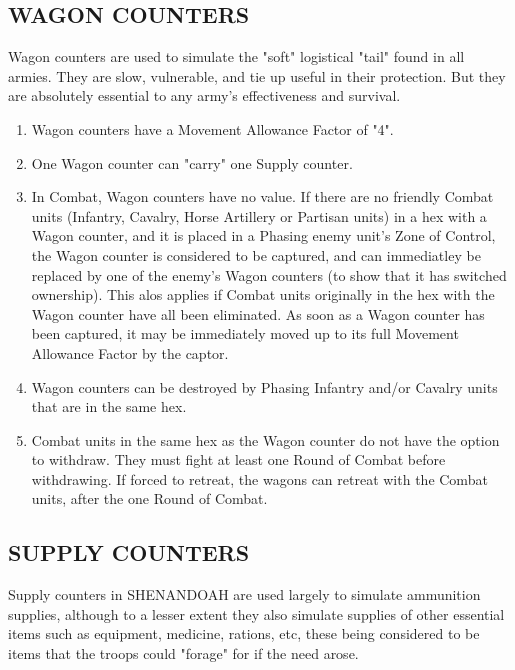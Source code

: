 \subsection{WAGON COUNTERS}

Wagon counters are used to simulate the "soft" logistical "tail" found in all armies. They are slow, vulnerable, and tie up useful in their protection. But they are absolutely essential to any army's effectiveness and survival.

\begin{enumerate}
  \item Wagon counters have a Movement Allowance Factor of "4".

  \item One Wagon counter can "carry" one Supply counter.

  \item In Combat, Wagon counters have no value. If there are no friendly Combat units (Infantry, Cavalry, Horse Artillery or Partisan units) in a hex with a Wagon counter, and it is placed in a Phasing enemy unit's Zone of Control, the Wagon counter is considered to be captured, and can immediatley be replaced by one of the enemy's Wagon counters (to show that it has switched ownership). This alos applies if Combat units originally in the hex with the Wagon counter have all been eliminated. As soon as a Wagon counter has been captured, it may be immediately moved up to its full Movement Allowance Factor by the captor.

  \item Wagon counters can be destroyed by Phasing Infantry and/or Cavalry units that are in the same hex.

  \item Combat units in the same hex as the Wagon counter do not have the option to withdraw. They must fight at least one Round of Combat before withdrawing. If forced to retreat, the wagons can retreat with the Combat units, after the one Round of Combat.
\end{enumerate}

\subsection{SUPPLY COUNTERS}

Supply counters in SHENANDOAH are used largely to simulate ammunition supplies, although to a lesser extent they also simulate supplies of other essential items such as equipment, medicine, rations, etc, these being considered to be items that the troops could "forage" for if the need arose.

